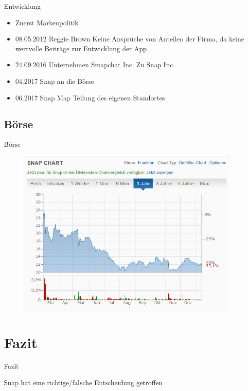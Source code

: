 \documentclass{beamer}
\begin{document}
\begin{frame} {Entwicklung}
\begin{itemize}
\item Zuerst Markenpolitik \pause
\item  08.05.2012 Reggie Brown Keine Ansprüche von Anteilen der Firma, da keine wertvolle Beiträge zur Entwicklung der App \pause
\item  24.09.2016 Unternehmen Smapchat Inc. Zu Snap Inc. \pause
\item  04.2017 Snap an die Börse \pause
\item 06.2017 Snap Map Teilung des eigenen Standortes \pause

\end{itemize}
\end{frame}

\subsection{Börse}
\begin{frame}{Börse}
\begin{figure}
	\includegraphics[width=0.7\linewidth]{SnapAktie.png}
\end{figure}
\end{frame}


\section{Fazit}
\begin{frame}{Fazit}

Snap hat eine richtige/falsche Entscheidung getroffen

\end{frame}
\end{document}

